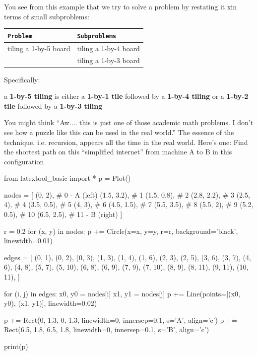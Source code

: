 You see from this example that we try to solve a problem by restating it xin terms of small subproblems:

\begin{center}
\begin{tabular}{ll}
\texttt{Problem} & \texttt{Subproblems} \\
\hline
tiling a 1-by-5 board & tiling a 1-by-4 board \\
                      & tiling a 1-by-3 board \\
\end{tabular}
\end{center}

Specifically:

a \textbf{1-by-5 tiling} is either a \textbf{1-by-1 tile} followed by a \textbf{1-by-4 tiling} or a \textbf{1-by-2 tile} followed by a \textbf{1-by-3 tiling}


You might think ``Aw.... this is just one of those academic math
problems. I don't see how a puzzle like this can be used
in the real world.'' The essence of the technique, i.e. recursion,
appears all the time in the real world. Here's one: Find
the shortest path on this ``simplified internet'' from machine A to B in
this configuration

\begin{python}
from latextool_basic import *
p = Plot()

nodes = [
    (0, 2),      # 0 - A (left)
    (1.5, 3.2),  # 1
    (1.5, 0.8),  # 2
    (2.8, 2.2),  # 3
    (2.5, 4),    # 4
    (3.5, 0.5),  # 5
    (4, 3),      # 6
    (4.5, 1.5),  # 7
    (5.5, 3.5),  # 8
    (5.5, 2),    # 9
    (5.2, 0.5),  # 10
    (6.5, 2.5),  # 11 - B (right)
]

r = 0.2
for (x, y) in nodes:
    p += Circle(x=x, y=y, r=r, background='black', linewidth=0.01)

edges = [
    (0, 1), (0, 2), (0, 3),
    (1, 3), (1, 4), (1, 6),
    (2, 3), (2, 5),
    (3, 6), (3, 7),
    (4, 6), (4, 8),
    (5, 7), (5, 10),
    (6, 8), (6, 9),
    (7, 9), (7, 10),
    (8, 9), (8, 11),
    (9, 11),
    (10, 11),
]

for (i, j) in edges:
    x0, y0 = nodes[i]
    x1, y1 = nodes[j]
    p += Line(points=[(x0, y0), (x1, y1)], linewidth=0.02)

p += Rect(0, 1.3, 0, 1.3, linewidth=0, innersep=0.1, s='A', align='c')
p += Rect(6.5, 1.8, 6.5, 1.8, linewidth=0, innersep=0.1, s='B', align='c')

print(p)
\end{python}

